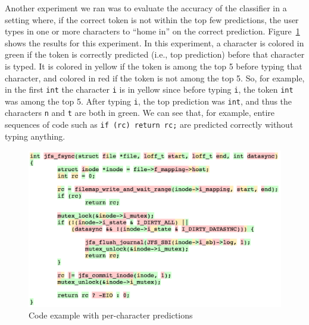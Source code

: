 Another experiment we ran was to evaluate the accuracy of the classifier in a
setting where, if the correct token is not within the top few predictions, the
user types in one or more characters to ``home in'' on the correct prediction.
Figure~\ref{fig:codeexample} shows the results for this experiment. In this
experiment, a character is colored in green if the token is correctly predicted
(i.e., top prediction) before that character is typed. It is colored in yellow
if the token is among the top 5 before typing that character, and colored in red
if the token is not among the top 5. So, for example, in the first
{\tt int} the character {\tt i} is in yellow since before typing {\tt i}, the
token {\tt int} was among the top 5. After typing {\tt i}, the top prediction
was {\tt int}, and thus the characters {\tt n} and {\tt t} are both in green. We
can see that, for example, entire sequences of code such as {\tt if (rc) return
rc;} are predicted correctly without typing anything.
\begin{figure}[h]
  \centering
  \includegraphics[width=\linewidth]{figs/code_example.png}
  \caption{Code example with per-character predictions}
  \label{fig:codeexample}
\end{figure}

